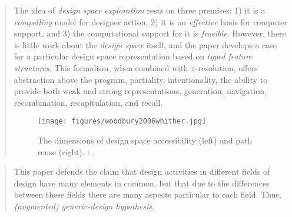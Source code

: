 		\begin{quote}
		\small
		The idea of {\em design space exploration} rests on three premises: 
		1) it is a {\em compelling} model for designer action, 
		2) it is an {\em effective} basis for computer support, and 
		3) the computational support for it is {\em feasible}. 
		However, there is little work about the {\em design space} itself,
		and the paper develops a case for a particular design space representation
		based on {\em typed feature structures}. This formalism, when combined
		with $\pi$-resolution, offers 
		abstraction above the program,
		partiality,
		intentionality,
		the ability to provide both weak and strong representations,
		generation,
		navigation,
		recombination,
		recapitulation, and
		recall. 
		\begin{figure}[htb]
		\begin{center}
		\texttt{[image: figures/woodbury2006whither.jpg]}
		\caption{
		The dimensions of design space accessibility (left) and path reuse (right). 
		\citeauthor{woodbury2006whither}: 
		\cite{woodbury2006whither}.}
		\label{woodbury2006whither}
		\end{center}
		\end{figure}
		\end{quote}

		\begin{quote}
		\small
		This paper defends the claim that design activities in different fields of design have 
		many elements in common, but that due to the differences between these fields there
		are many aspects particular to each field. Thus, {\em (augmented) generic-design hypothesis}.
		\end{quote}

